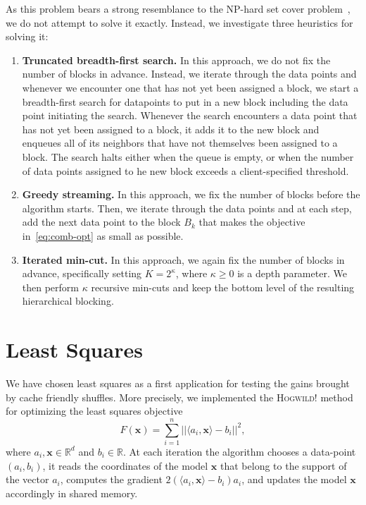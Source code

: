 \documentclass[times,11pt]{article}
\numberwithin{equation}{section}		%
\numberwithin{figure}{section}			%
\numberwithin{table}{section}				%
\newcommand{\ltwonorm}[1]{\left|\left|{#1}\right|\right|}
\newcommand{\xvec}{\mathbf{x}}
\newcommand{\HW}{\textsc{Hogwild!}}
\newcommand{\RR}{\mathbb{R}}
\begin{document}
As this problem bears a strong resemblance to the NP-hard set cover problem~\cite{arora2009computational}, we do not attempt to solve it exactly. Instead, we investigate three heuristics for solving it:
\begin{enumerate}
\item
{\bf Truncated breadth-first search.} In this approach, we do not fix the number of blocks in advance. Instead, we iterate through the data points and whenever we encounter one that has not yet been assigned a block, we start a breadth-first search for datapoints to put in a new block including the data point initiating the 
search. Whenever the search encounters a data point that has not yet been assigned to a block, it adds it to the new block and enqueues all of its neighbors that have not themselves been assigned to a block. The search halts either when the queue is empty, or when the number of data points assigned to he new block
exceeds a client-specified threshold.

\item
{\bf Greedy streaming.} In this approach, we fix the number of blocks before the algorithm starts. Then, we iterate through the data points and at each step, add the next data point to the block $B_{k}$ that makes the objective in~\eqref{eq:comb-opt} as small as possible.
\item
{\bf Iterated min-cut.} In this approach, we again fix the number of blocks in advance, specifically setting $K = 2^{\kappa}$, where $\kappa \geq 0$ is a depth parameter. We then perform $\kappa$ recursive min-cuts and keep the bottom level of the resulting hierarchical blocking.
\end{enumerate}

\section{Least Squares}\label{sec:ls}

We have chosen least squares as a first application for testing the gains brought by cache friendly shuffles.
More precisely, we  implemented the \HW{} method for optimizing the least squares objective 
\begin{equation}
\label{eq:LS}
F(\xvec) = \sum_{i = 1}^n \ltwonorm{\langle a_i, \xvec \rangle - b_i}^2,
\end{equation}
where $a_i, \xvec \in \RR^d$ and $b_i\in \RR$. 
At each iteration the algorithm chooses a data-point $(a_i, b_i)$, it reads the coordinates of the model $\xvec$ that belong to the support of the vector $a_i$, computes the gradient $2(\langle a_i, \xvec\rangle - b_i)a_i$, and updates the model $\xvec$ accordingly in shared memory.
\end{document}
